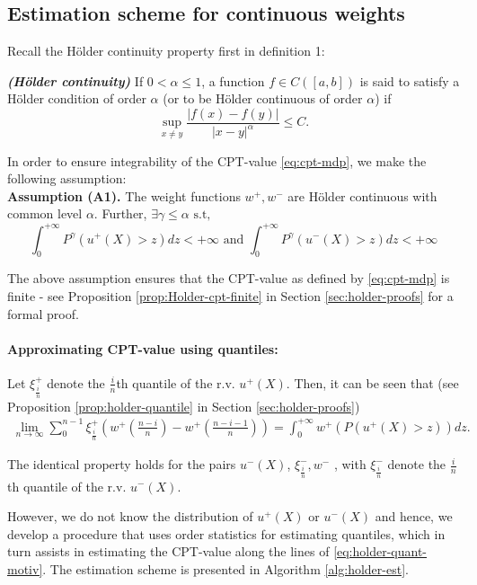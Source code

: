 \documentclass[11pt,letterpaper,english]{article}
\begin{document}
\subsection{Estimation scheme for \holder continuous weights}
Recall the H\"{o}lder continuity property first in definition 1:
\begin{definition}
{\textbf{\textit{(H\"{o}lder continuity)}}}
If $0 < \alpha \leq 1$, a function $f \in C([a,b])$ is said to satisfy
a H\"{o}lder condition of order $\alpha$ (or to be H\"{o}lder continuous
of order $\alpha$) if
\[
\sup_{x \neq y} \frac{| f(x) - f(y) |}{| x-y |^{\alpha}} \leq C .
\]
\end{definition}

In order to ensure integrability of the CPT-value \eqref{eq:cpt-mdp}, we make the following assumption:\\[1ex]
\textbf{Assumption (A1).}  
The weight functions $w^+, w^-$ are H\"{o}lder continuous with common level $\alpha$. Further,
$\exists \gamma \le \alpha \text{   s.t,  }$ 
$$\int_0^{+\infty} P^{\gamma} (u^+(X)>z) dz < +\infty \text{ and }\int_0^{+\infty} P^{\gamma} (u^-(X)>z) dz < +\infty$$

The above assumption ensures that the CPT-value as defined by \eqref{eq:cpt-mdp} is finite - see Proposition \ref{prop:Holder-cpt-finite} in Section \ref{sec:holder-proofs} for a formal proof.


\paragraph{Approximating CPT-value using quantiles:}
Let $\xi^+_{\frac{i}{n}}$ denote the $\frac{i}{n}$th quantile of the r.v. $u^+(X)$. Then, it can be seen that (see Proposition \ref{prop:holder-quantile} in Section \ref{sec:holder-proofs})
\begin{align}
\label{eq:holder-quant-motiv}
\lim_{n \rightarrow \infty} \sum_0^{n-1} \xi^+_{\frac{i}{n}} \left(w^+\left(\frac{n-i}{n}\right)- w^+\left(\frac{n-i-1}{n}\right) \right) = \int_0^{+\infty} w^+(P(u^+(X)>z)) dz.
\end{align}

The identical property holds for the pairs $u^-(X)$, $\xi^-_{\frac{i}{n}}, w^-$ , with $\xi^-_{\frac{i}{n}}$ denote the 
$\frac{i}{n}$th quantile of the r.v. $u^-(X)$.

However, we do not know the distribution of $u^+(X)$ or $u^-(X)$ and hence, we develop a procedure that uses order statistics for estimating quantiles, which in turn assists in estimating the CPT-value along the lines of \eqref{eq:holder-quant-motiv}. The estimation scheme is presented in Algorithm \ref{alg:holder-est}.
\end{document}
